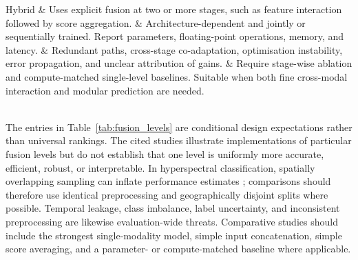 \documentclass[]{interact}
\theoremstyle{plain}%
\theoremstyle{definition}
\theoremstyle{remark}
\DeclareRobustCommand{\DIFadd}[1]{{\protect\color{DIFaddcolor}\uwave{#1}}}
\def\DIFadd#1{#1}%
\begin{document}
\begin{table}[!htbp]
\begin{tabular}
		\addlinespace[2pt]
		Hybrid & Uses explicit fusion at two or more stages, such as feature interaction followed by score aggregation. & Architecture-dependent and jointly or sequentially trained. Report parameters, floating-point operations, memory, and latency. & Redundant paths, cross-stage co-adaptation, optimisation instability, error propagation, and unclear attribution of gains. & Require stage-wise ablation and compute-matched single-level baselines. Suitable when both fine cross-modal interaction and modular prediction are needed. \\
		\midrule
		 \\
		\bottomrule
	\end{tabular}
\end{table}

\DIFadd{The} \DIFadd{entries} \DIFadd{in} \DIFadd{Table}\DIFadd{~}{\color{blue}\ref{tab:fusion_levels} }\DIFadd{are} \DIFadd{conditional} \DIFadd{design} \DIFadd{expectations} \DIFadd{rather} \DIFadd{than} \DIFadd{universal} \DIFadd{rankings}\DIFadd{.} \DIFadd{The} \DIFadd{cited} \DIFadd{studies} \DIFadd{illustrate} \DIFadd{implementations} \DIFadd{of} \DIFadd{particular} \DIFadd{fusion} \DIFadd{levels} \DIFadd{but} \DIFadd{do} \DIFadd{not} \DIFadd{establish} \DIFadd{that} \DIFadd{one} \DIFadd{level} \DIFadd{is} \DIFadd{uniformly} \DIFadd{more} \DIFadd{accurate}\DIFadd{,} \DIFadd{efficient}\DIFadd{,} \DIFadd{robust}\DIFadd{,} \DIFadd{or} \DIFadd{interpretable}\DIFadd{.} \DIFadd{In} \DIFadd{hyperspectral} \DIFadd{classification}\DIFadd{,} \DIFadd{spatially} \DIFadd{overlapping} \DIFadd{sampling} \DIFadd{can} \DIFadd{inflate} \DIFadd{performance} \DIFadd{estimates} {\color{blue}\citep{liang2017sampling}}\DIFadd{;} \DIFadd{comparisons} \DIFadd{should} \DIFadd{therefore} \DIFadd{use} \DIFadd{identical} \DIFadd{preprocessing} \DIFadd{and} \DIFadd{geographically} \DIFadd{disjoint} \DIFadd{splits} \DIFadd{where} \DIFadd{possible}\DIFadd{.} \DIFadd{Temporal} \DIFadd{leakage}\DIFadd{,} \DIFadd{class} \DIFadd{imbalance}\DIFadd{,} \DIFadd{label} \DIFadd{uncertainty}\DIFadd{,} \DIFadd{and} \DIFadd{inconsistent} \DIFadd{preprocessing} \DIFadd{are} \DIFadd{likewise} \DIFadd{evaluation-wide} \DIFadd{threats}\DIFadd{.} \DIFadd{Comparative} \DIFadd{studies} \DIFadd{should} \DIFadd{include} \DIFadd{the} \DIFadd{strongest} \DIFadd{single-modality} \DIFadd{model}\DIFadd{,} \DIFadd{simple} \DIFadd{input} \DIFadd{concatenation}\DIFadd{,} \DIFadd{simple} \DIFadd{score} \DIFadd{averaging}\DIFadd{,} \DIFadd{and} \DIFadd{a} \DIFadd{parameter-} \DIFadd{or} \DIFadd{compute-matched} \DIFadd{baseline} \DIFadd{where} \DIFadd{applicable}\DIFadd{.}
\end{document}

